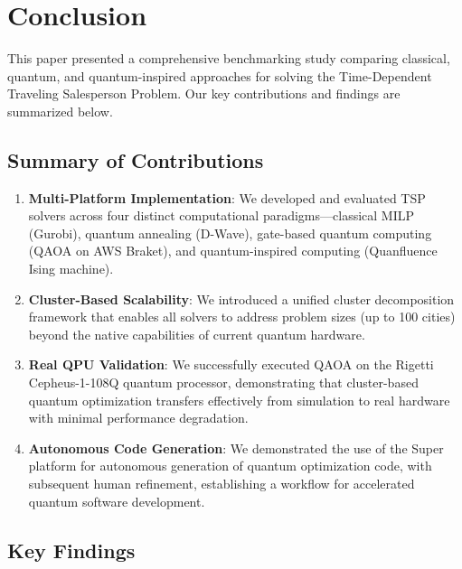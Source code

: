 \documentclass[conference]{IEEEtran}
\begin{document}
\section{Conclusion}

This paper presented a comprehensive benchmarking study comparing classical, quantum, and quantum-inspired approaches for solving the Time-Dependent Traveling Salesperson Problem. Our key contributions and findings are summarized below.

\subsection{Summary of Contributions}

\begin{enumerate}
\item \textbf{Multi-Platform Implementation}: We developed and evaluated TSP solvers across four distinct computational paradigms---classical MILP (Gurobi), quantum annealing (D-Wave), gate-based quantum computing (QAOA on AWS Braket), and quantum-inspired computing (Quanfluence Ising machine).

\item \textbf{Cluster-Based Scalability}: We introduced a unified cluster decomposition framework that enables all solvers to address problem sizes (up to 100 cities) beyond the native capabilities of current quantum hardware.

\item \textbf{Real QPU Validation}: We successfully executed QAOA on the Rigetti Cepheus-1-108Q quantum processor, demonstrating that cluster-based quantum optimization transfers effectively from simulation to real hardware with minimal performance degradation.

\item \textbf{Autonomous Code Generation}: We demonstrated the use of the Super platform for autonomous generation of quantum optimization code, with subsequent human refinement, establishing a workflow for accelerated quantum software development.
\end{enumerate}

\subsection{Key Findings}
\end{document}
